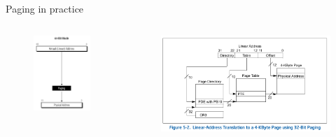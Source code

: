 \begin{frame}[fragile]{Paging in practice}

	\begin{columns}
		\begin{column}{0.3\textwidth}
			\begin{figure}[H]
				\centering
				\includegraphics[width=\textwidth]{day3/img/page.png}
			\end{figure}
		\end{column}
		\begin{column}{0.7\textwidth}
			\begin{figure}[H]
				\centering
				\includegraphics[width=\textwidth]{day3/img/page-table.png}
			\end{figure}
		\end{column}
	\end{columns}

\end{frame}
